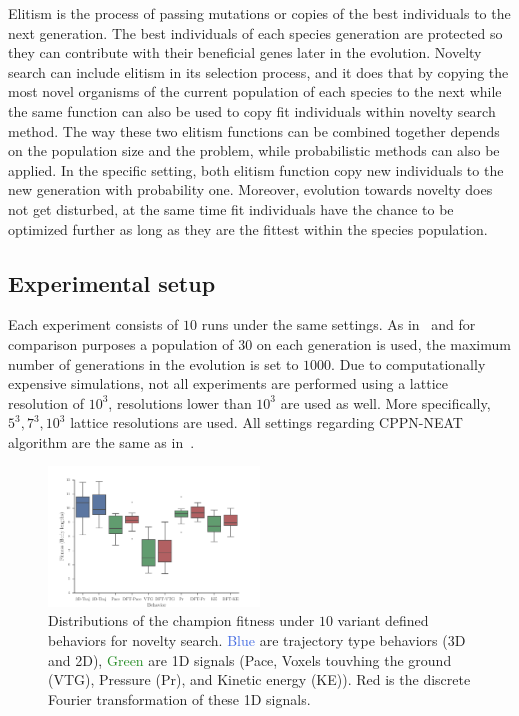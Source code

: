 \documentclass{sig-alternate}
\begin{document}
Elitism is the process of passing mutations or copies of the best individuals to the next generation. The best individuals of each species generation are protected so they can contribute with their beneficial genes later in the evolution. Novelty search can include elitism in its selection process, and it does that by copying the most novel organisms of the current population of each species to the next while the same function can also be used to copy fit individuals within novelty search method. The way these two elitism functions can be combined together depends on the population size and the problem, while probabilistic methods can also be applied. In the specific setting, both elitism function copy new individuals to the new generation with probability one. Moreover, evolution towards novelty does not get disturbed, at the same time fit individuals have the chance to be optimized further as long as they are the fittest within the species population. 

\subsection{Experimental setup}
Each experiment consists of $10$ runs under the same settings. As in~\cite{cheney2013unshackling} and for comparison purposes a population of $30$ on each generation is used, the maximum number of generations in the evolution is set to $1000$. Due to computationally expensive simulations, not all experiments are performed using a lattice resolution of $10^3$, resolutions lower than $10^3$ are used as well. More specifically, $5^3, 7^3, 10^3$ lattice resolutions are used. All settings regarding CPPN-NEAT algorithm are the same as in~\cite{cheney2013unshackling}.



\begin{figure}[b!]
\centering
\includegraphics[width=0.5\textwidth]{../Figures/Results/BehaviorPerformanceNoveltyOnly.pdf}
\caption{Distributions of the champion fitness under $10$ variant defined behaviors for novelty search. \textcolor{RoyalBlue}{Blue} are trajectory type behaviors (3D and 2D), \textcolor{ForestGreen}{Green} are 1D signals (Pace, Voxels touvhing the ground (VTG), Pressure (Pr), and Kinetic energy (KE)). \textcolor{BrickRed}{Red} is the discrete Fourier transformation of these 1D signals.}
\label{fig:BehaviorsPerformance}
\vspace{-15pt}
\end{figure}
\end{document}
